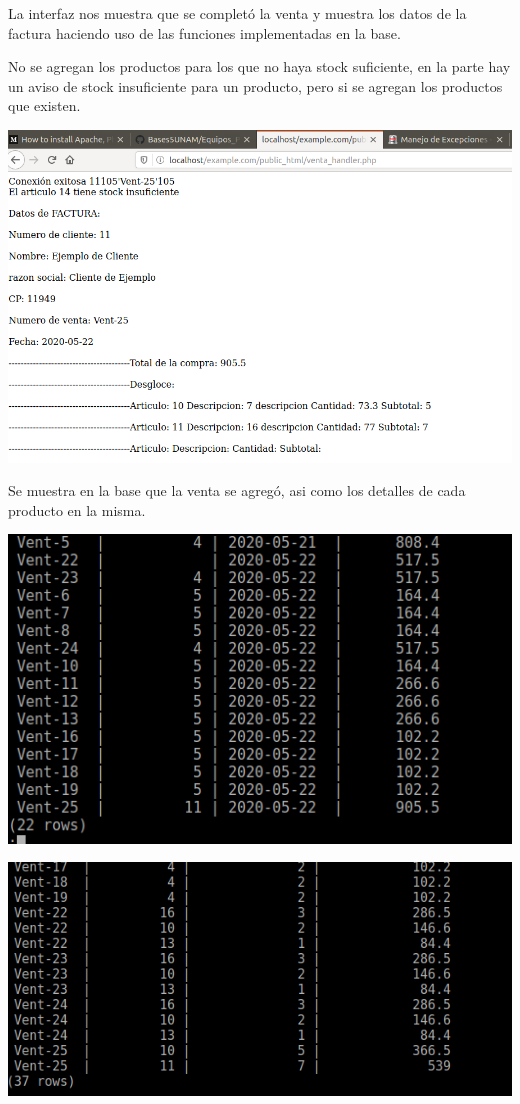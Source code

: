 \documentclass[12pt, letterpaper]{article}     %
\begin{document}
		La interfaz nos muestra que se completó la venta y muestra los datos de la factura haciendo uso de las funciones implementadas en la base.
		
		No se agregan los productos para los que no haya stock suficiente, en la parte hay un aviso de stock insuficiente para un producto, pero si se agregan los productos que existen.		
				
		\begin{center}
 	  	\includegraphics[scale=0.5]{web_venta_res}
		\end{center}		
		
		Se muestra en la base que la venta se agregó, asi como los detalles de cada producto en la misma.		
		
		\begin{center}
 	  	\includegraphics[scale=0.5]{web_venta_after}
		\end{center}
		
		\begin{center}
 	  	\includegraphics[scale=0.5]{web_venta_detalles_after}
		\end{center}
		
\end{document}
